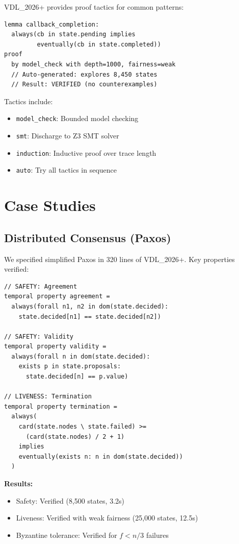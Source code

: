 \documentclass[conference]{IEEEtran}
\begin{document}
VDL\_2026+ provides proof tactics for common patterns:

\begin{lstlisting}[caption={Proof automation}]
lemma callback_completion:
  always(cb in state.pending implies
         eventually(cb in state.completed))
proof
  by model_check with depth=1000, fairness=weak
  // Auto-generated: explores 8,450 states
  // Result: VERIFIED (no counterexamples)
\end{lstlisting}

Tactics include:
\begin{itemize}
\item \texttt{model\_check}: Bounded model checking
\item \texttt{smt}: Discharge to Z3 SMT solver
\item \texttt{induction}: Inductive proof over trace length
\item \texttt{auto}: Try all tactics in sequence
\end{itemize}

\section{Case Studies}
\label{sec:casestudies}

\subsection{Distributed Consensus (Paxos)}

We specified simplified Paxos in 320 lines of VDL\_2026+. Key properties verified:

\begin{lstlisting}[caption={Consensus properties}]
// SAFETY: Agreement
temporal property agreement =
  always(forall n1, n2 in dom(state.decided):
    state.decided[n1] == state.decided[n2])

// SAFETY: Validity
temporal property validity =
  always(forall n in dom(state.decided):
    exists p in state.proposals:
      state.decided[n] == p.value)

// LIVENESS: Termination
temporal property termination =
  always(
    card(state.nodes \ state.failed) >=
      (card(state.nodes) / 2 + 1)
    implies
    eventually(exists n: n in dom(state.decided))
  )
\end{lstlisting}

\textbf{Results:}
\begin{itemize}
\item Safety: Verified (8,500 states, 3.2s)
\item Liveness: Verified with weak fairness (25,000 states, 12.5s)
\item Byzantine tolerance: Verified for $f < n/3$ failures
\end{itemize}
\end{document}
